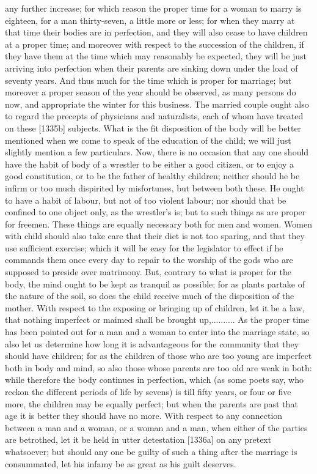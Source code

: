 \documentclass[12pt]{article}
\begin{document}
any further increase; for which reason the proper time for a woman to marry is eighteen, for a man thirty-seven, a little more or less; for when they marry at that time their bodies are in perfection, and they will also cease to have children at a proper time; and moreover with respect to the succession of the children, if they have them at the time which may reasonably be expected, they will be just arriving into perfection when their parents are sinking down under the load of seventy years. And thus much for the time which is proper for marriage; but moreover a proper season of the year should be observed, as many persons do now, and appropriate the winter for this business. The married couple ought also to regard the precepts of physicians and naturalists, each of whom have treated on these [1335b] subjects. What is the fit disposition of the body will be better mentioned when we come to speak of the education of the child; we will just slightly mention a few particulars. Now, there is no occasion that any one should have the habit of body of a wrestler to be either a good citizen, or to enjoy a good constitution, or to be the father of healthy children; neither should he be infirm or too much dispirited by misfortunes, but between both these. He ought to have a habit of labour, but not of too violent labour; nor should that be confined to one object only, as the wrestler's is; but to such things as are proper for freemen. These things are equally necessary both for men and women. Women with child should also take care that their diet is not too sparing, and that they use sufficient exercise; which it will be easy for the legislator to effect if he commands them once every day to repair to the worship of the gods who are supposed to preside over matrimony. But, contrary to what is proper for the body, the mind ought to be kept as tranquil as possible; for as plants partake of the nature of the soil, so does the child receive much of the disposition of the mother. With respect to the exposing or bringing up of children, let it be a law, that nothing imperfect or maimed shall be brought up,.......... As the proper time has been pointed out for a man and a woman to enter into the marriage state, so also let us determine how long it is advantageous for the community that they should have children; for as the children of those who are too young are imperfect both in body and mind, so also those whose parents are too old are weak in both: while therefore the body continues in perfection, which (as some poets say, who reckon the different periods of life by sevens) is till fifty years, or four or five more, the children may be equally perfect; but when the parents are past that age it is better they should have no more. With respect to any connection between a man and a woman, or a woman and a man, when either of the parties are betrothed, let it be held in utter detestation [1336a] on any pretext whatsoever; but should any one be guilty of such a thing after the marriage is consummated, let his infamy be as great as his guilt deserves.
\end{document}
